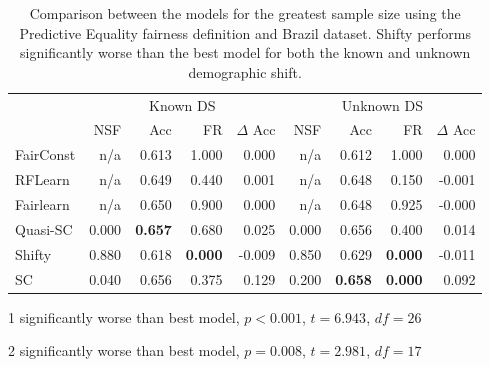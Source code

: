 \begin{table}[H]
\begin{threeparttable}
\centering
\begin{tabular}{lrrrrrrrr}
\toprule
 & \multicolumn{4}{c}{Known DS} & \multicolumn{4}{c}{Unknown DS} \\
 & NSF & Acc & FR & $\Delta$ Acc & NSF & Acc & FR & $\Delta$ Acc \\
\cmidrule(r){2-5} \cmidrule{6-9}
FairConst & n/a & 0.613 & 1.000 & 0.000 & n/a & 0.612 & 1.000 & 0.000 \\
RFLearn & n/a & 0.649 & 0.440 & 0.001 & n/a & 0.648 & 0.150 & -0.001 \\
Fairlearn & n/a & 0.650 & 0.900 & 0.000 & n/a & 0.648 & 0.925 & -0.000 \\
Quasi-SC & 0.000 & \bfseries 0.657 & 0.680 & 0.025 & 0.000 & 0.656 & 0.400 & 0.014 \\
Shifty & 0.880 & 0.618\tnote{1} & \bfseries 0.000 & -0.009 & 0.850 & 0.629\tnote{2} & \bfseries 0.000 & -0.011 \\
SC & 0.040 & 0.656 & 0.375 & 0.129 & 0.200 & \bfseries 0.658 & \bfseries 0.000 & 0.092 \\
\bottomrule
\end{tabular}
\begin{tablenotes}
\item[1] significantly worse than best model, $p<0.001$, $t=6.943$, $df=26$
\item[2] significantly worse than best model, $p=0.008$, $t=2.981$, $df=17$
\end{tablenotes}
\end{threeparttable}
\caption{Comparison between the models for the greatest sample size using the Predictive Equality fairness definition and Brazil dataset. Shifty performs significantly worse than the best model for both the known and unknown demographic shift.}
\label{pe_brazil}
\end{table}

